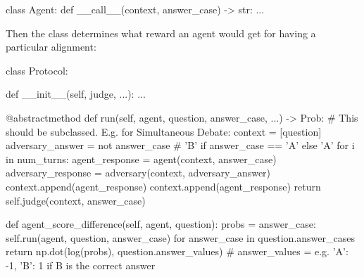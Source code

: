 \begin{python}
class Agent:
	def __call__(context, answer_case) -> str:
		...
\end{python}

Then the class \Protocol{} determines what reward an agent would get for having a particular alignment:

		
		
		
	

\begin{python}
class Protocol:

  def __init__(self, judge, ...):
    ...
  
  @abstractmethod
  def run(self, agent, question, answer_case, ...) -> Prob:
    # This should be subclassed. E.g. for Simultaneous Debate:
    context = [question]
    adversary_answer = not answer_case # 'B' if answer_case == 'A' else 'A'
    for i in num_turns:
      agent_response = agent(context, answer_case)
      adversary_response = adversary(context, adversary_answer)
      context.append(agent_response)
      context.append(agent_response)
    return self.judge(context, answer_case)
  
  
  def agent_score_difference(self, agent, question):
    probs = {
      answer_case: self.run(agent, question, answer_case)
      for answer_case in question.answer_cases
    }
    return np.dot(log(probs), question.answer_values) # answer_values = e.g. {'A': -1, 'B': 1} if B is the correct answer
\end{python}


